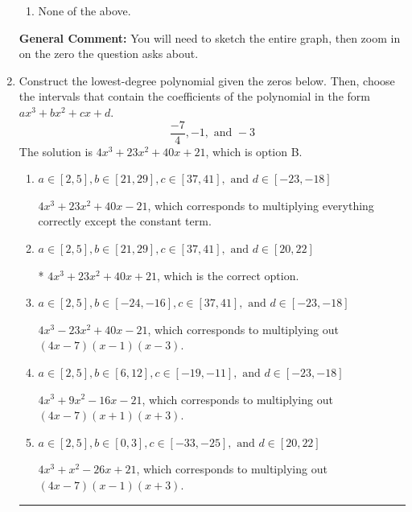 \documentclass{extbook}[14pt]
\newcommand{\litem}[1]{\item #1

\rule{\textwidth}{0.4pt}}
\begin{document}
\begin{enumerate}
{\begin{enumerate}[label=\Alph*.]
\item None of the above.\end{enumerate}
\textbf{General Comment:} You will need to sketch the entire graph, then zoom in on the zero the question asks about.
}
\litem{
Construct the lowest-degree polynomial given the zeros below. Then, choose the intervals that contain the coefficients of the polynomial in the form $ax^3+bx^2+cx+d$.
\[ \frac{-7}{4}, -1, \text{ and } -3 \]The solution is \( 4x^{3} +23 x^{2} +40 x + 21 \), which is option B.\begin{enumerate}[label=\Alph*.]
\item \( a \in [2, 5], b \in [21, 29], c \in [37, 41], \text{ and } d \in [-23, -18] \)

$4x^{3} +23 x^{2} +40 x -21$, which corresponds to multiplying everything correctly except the constant term.
\item \( a \in [2, 5], b \in [21, 29], c \in [37, 41], \text{ and } d \in [20, 22] \)

* $4x^{3} +23 x^{2} +40 x + 21$, which is the correct option.
\item \( a \in [2, 5], b \in [-24, -16], c \in [37, 41], \text{ and } d \in [-23, -18] \)

$4x^{3} -23 x^{2} +40 x -21$, which corresponds to multiplying out $(4x -7)(x -1)(x -3)$.
\item \( a \in [2, 5], b \in [6, 12], c \in [-19, -11], \text{ and } d \in [-23, -18] \)

$4x^{3} +9 x^{2} -16 x -21$, which corresponds to multiplying out $(4x -7)(x + 1)(x + 3)$.
\item \( a \in [2, 5], b \in [0, 3], c \in [-33, -25], \text{ and } d \in [20, 22] \)

$4x^{3} + x^{2} -26 x + 21$, which corresponds to multiplying out $(4x -7)(x -1)(x + 3)$.
\end{enumerate}

}
\end{enumerate}
\end{document}
